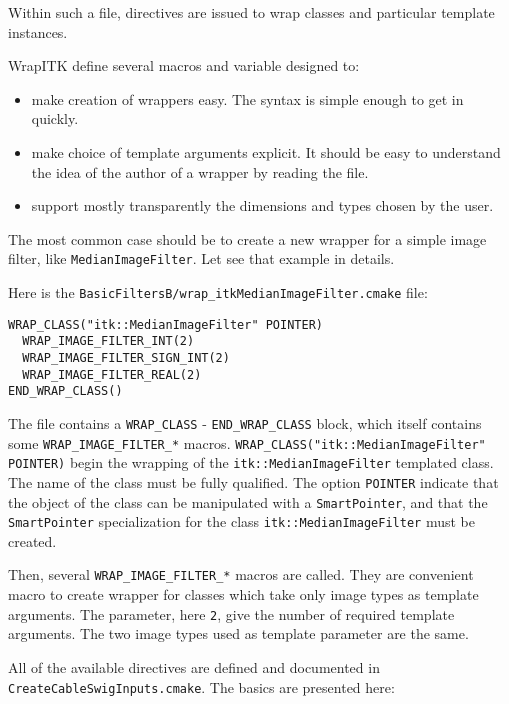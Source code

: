 \documentclass{InsightArticle}
\begin{document}
Within such a file, directives are issued to wrap classes and particular
template instances. 

WrapITK define several macros and variable designed to:
\begin{itemize}
  \item make creation of wrappers easy. The syntax is simple enough to get in quickly.
  \item make choice of template arguments explicit. It should be easy to understand
the idea of the author of a wrapper by reading the file.
  \item support mostly transparently the dimensions and types chosen by the user.
\end{itemize}

The most common case should be to create a new wrapper for a simple image filter, like 
\verb$MedianImageFilter$. Let see that example in details.

Here is the \verb$BasicFiltersB/wrap_itkMedianImageFilter.cmake$ file:

\small \begin{verbatim}
WRAP_CLASS("itk::MedianImageFilter" POINTER)
  WRAP_IMAGE_FILTER_INT(2)
  WRAP_IMAGE_FILTER_SIGN_INT(2)
  WRAP_IMAGE_FILTER_REAL(2)
END_WRAP_CLASS()
\end{verbatim} \normalsize

The file contains a \verb$WRAP_CLASS$ - \verb$END_WRAP_CLASS$ block, which itself contains
some \verb$WRAP_IMAGE_FILTER_*$ macros. \verb$WRAP_CLASS("itk::MedianImageFilter" POINTER)$
begin the wrapping of the \verb$itk::MedianImageFilter$ templated class. The name of the class
must be fully qualified. The option \verb$POINTER$ indicate that the object of the class can be
manipulated with a \verb$SmartPointer$, and that the \verb$SmartPointer$ specialization for
the class \verb$itk::MedianImageFilter$ must be created.

Then, several \verb$WRAP_IMAGE_FILTER_*$ macros are called. They are convenient macro to
create wrapper for classes which take only image types as template arguments. The parameter,
here \verb$2$, give the number of required template arguments. The two image types used as
template parameter are the same.

All of the available directives are defined and documented
in \verb$CreateCableSwigInputs.cmake$. The basics are presented here:
\end{document}
